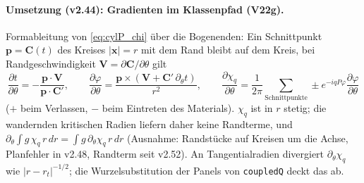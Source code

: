 \paragraph{Umsetzung (v2.44): Gradienten im Klassenpfad (V22g).}
Formableitung von \eqref{eq:cylP_chi} über die Bogenenden: Ein Schnittpunkt $\mathbf p=\mathbf C(t)$ des Kreises
$|\mathbf x|=r$ mit dem Rand bleibt auf dem Kreis, bei Randgeschwindigkeit $\mathbf V=\partial\mathbf C/\partial\theta$ gilt
\begin{equation}
  \frac{\partial t}{\partial\theta}=-\frac{\mathbf p\cdot\mathbf V}{\mathbf p\cdot\mathbf C'},\qquad
  \frac{\partial\varphi}{\partial\theta}=\frac{\mathbf p\times(\mathbf V+\mathbf C'\,\partial_\theta t)}{r^2},\qquad
  \frac{\partial\chi_q}{\partial\theta}=\frac1{2\pi}\sum_{\text{Schnittpunkte}}\pm e^{-iqP\varphi}\frac{\partial\varphi}{\partial\theta}
  \label{eq:cylP_shape}
\end{equation}
($+$ beim Verlassen, $-$ beim Eintreten des Materials). $\chi_q$ ist in $r$ stetig; die wandernden kritischen Radien
liefern daher keine Randterme, und $\partial_\theta\int g\,\chi_q\,r\,dr=\int g\,\partial_\theta\chi_q\,r\,dr$ (Ausnahme:
Randstücke auf Kreisen um die Achse, Planfehler in v2.48, Randterm seit v2.52). An
Tangentialradien divergiert $\partial_\theta\chi_q$ wie $|r-r_t|^{-1/2}$; die Wurzelsubstitution der Panels von
\verb|coupledQ| deckt das ab.
